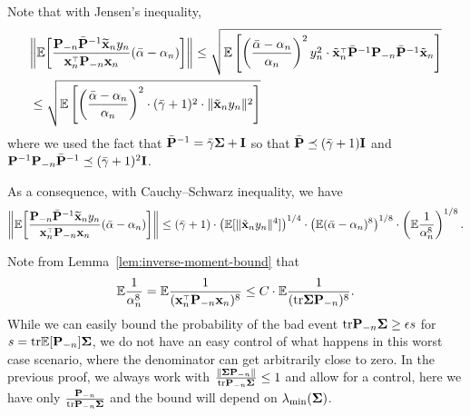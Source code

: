 \documentclass[11pt]{article}
\begin{document}
\clearpage

Note that with Jensen's inequality,
\begin{align*}
  &\bigg\|\E\bigg[\frac{\P_{-n}\bar\P^{-1}\xbt_ny_n}{\x_n^\top\P_{-n}\x_n} (\bar\alpha-\alpha_n)\bigg]\bigg\| \le \sqrt{ \E \left[ \left( \frac{\bar \alpha - \alpha_n}{\alpha_n} \right)^2 y_n^2 \cdot \tilde \x_n^\top \bar \P^{-1} \P_{-n} \bar \P^{-1} \tilde \x_n \right] } \\ 
  &\le \sqrt{ \E \left[ \left( \frac{\bar \alpha - \alpha_n}{\alpha_n} \right)^2 \cdot (\bar \gamma + 1)^2 \cdot \| \tilde \x_n y_n \|^2  \right] }
\end{align*}
where we used the fact that $\bar {\mathbf P}^{-1} = \bar \gamma \mathbf{\Sigma} + \mathbf I$ so that $\bar{\mathbf P} \preceq (\bar\gamma+1) \mathbf I$ and $\mathbf P^{-1} \mathbf P_{-n} \bar {\mathbf P}^{-1} \preceq (\bar\gamma+1)^2 \mathbf I$.


As a consequence, with Cauchy–Schwarz inequality, we have
\begin{align*}
  \bigg\|\E\bigg[\frac{\P_{-n}\bar\P^{-1}\xbt_ny_n}{\x_n^\top\P_{-n}\x_n} (\bar\alpha-\alpha_n)\bigg]\bigg\| \le (\bar \gamma + 1) \cdot \left( \E[ \| \tilde \x_n y_n \|^4 ] \right)^{1/4} \cdot \left( \E (\bar \alpha - \alpha_n)^8 \right)^{1/8} \cdot \left( \E \frac1{ \alpha_n^8 } \right)^{1/8}.
\end{align*}

Note from Lemma~\ref{lem:inverse-moment-bound} that
\[
  \E \frac1{ \alpha_n^8 } = \E \frac1{ (\x_n^\top \P_{-n} \x_n)^8} \le C \cdot \E \frac1{ (\tr \Sigmab \P_{-n})^8 }.
\]
While we can easily bound the probability of the bad event $\mathrm{tr} \mathbf P_{-n} \mathbf{\Sigma} \ge \epsilon s$ for $s = \mathrm{tr} \mathbb E[\mathbf P_{-n}] \mathbf{\Sigma}$, we do not have an easy control of what happens in this worst case scenario, where the denominator can get arbitrarily close to zero. In the previous proof, we always work with $\frac{\| \mathbf{\Sigma} \mathbf P_{-n} \| }{ \mathrm{tr} \mathbf P_{-n} \mathbf{\Sigma} } \le 1$ and allow for a control, here we have only $\frac{ \mathbf P_{-n} }{ \mathrm{tr} \mathbf P_{-n} \mathbf{\Sigma} }$ and the bound will depend on $\lambda_{\min}(\mathbf{\Sigma})$.
\end{document}
